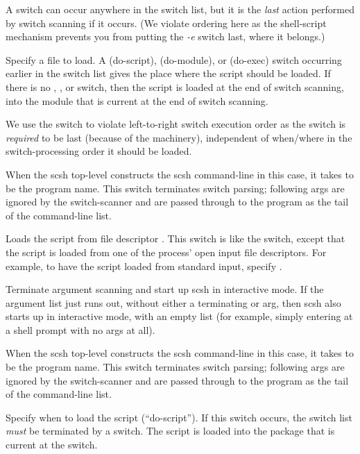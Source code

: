 \begin{itemize}
    A  switch can occur anywhere in the switch list, but it is the
    \emph{last} action performed by switch scanning if it occurs. 
    (We violate ordering here as the shell-script \ex{\#!} mechanism
     prevents you from putting the \emph{-e} switch last, where it belongs.)

    Specify a file to load.
    A  (do-script),  (do-module), or 
    (do-exec) switch occurring earlier in the switch list gives the
    place where the script should be loaded. If there is no ,
    , or  switch, then the script is loaded at the end of switch
    scanning, into the module that is current at the end of switch
    scanning.

    We use the  switch to violate left-to-right switch execution order
    as the  switch is \emph{required} to be last
    (because of the \ex{\#!} machinery), 
    independent of when/where in the switch-processing order 
    it should be loaded.

    When the scsh top-level constructs the scsh command-line in this case,
    it takes  to be the program name.
    This switch terminates switch parsing; following args are ignored
    by the switch-scanner and are passed through to the program as
    the tail of the command-line list.

    Loads the script from file descriptor . 
    This switch is like the  switch, 
    except that the script is loaded from one of the process' open input
    file descriptors.
    For example, to have the script loaded from standard input, specify
    .

\Item{--}
    Terminate argument scanning and start up scsh in interactive mode.
    If the argument list just runs out, without either a terminating 
     or \ex{--} arg, then scsh also starts up in interactive mode, 
    with an empty  list 
    (for example, simply entering  at a shell prompt with no
     args at all).

    When the scsh top-level constructs the scsh command-line in this case,
    it takes  to be the program name.
    This switch terminates switch parsing; following args are ignored
    by the switch-scanner and are passed through to the program as
    the tail of the command-line list.

    Specify when to load the script (``do-script''). If this switch occurs, 
    the switch list \emph{must} be terminated by a 
    switch. The script is loaded into the package that is current at the
     switch.


\end{itemize}

